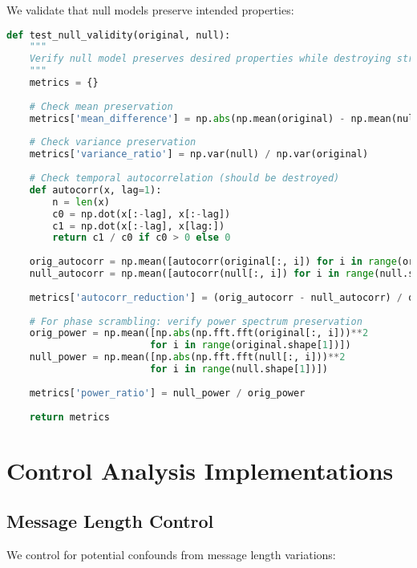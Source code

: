 \documentclass[11pt,letterpaper]{article}
\begin{document}
We validate that null models preserve intended properties:

\begin{lstlisting}[language=Python]
def test_null_validity(original, null):
    """
    Verify null model preserves desired properties while destroying structure.
    """
    metrics = {}
    
    # Check mean preservation
    metrics['mean_difference'] = np.abs(np.mean(original) - np.mean(null))
    
    # Check variance preservation
    metrics['variance_ratio'] = np.var(null) / np.var(original)
    
    # Check temporal autocorrelation (should be destroyed)
    def autocorr(x, lag=1):
        n = len(x)
        c0 = np.dot(x[:-lag], x[:-lag])
        c1 = np.dot(x[:-lag], x[lag:])
        return c1 / c0 if c0 > 0 else 0
    
    orig_autocorr = np.mean([autocorr(original[:, i]) for i in range(original.shape[1])])
    null_autocorr = np.mean([autocorr(null[:, i]) for i in range(null.shape[1])])
    
    metrics['autocorr_reduction'] = (orig_autocorr - null_autocorr) / orig_autocorr
    
    # For phase scrambling: verify power spectrum preservation
    orig_power = np.mean([np.abs(np.fft.fft(original[:, i]))**2 
                         for i in range(original.shape[1])])
    null_power = np.mean([np.abs(np.fft.fft(null[:, i]))**2 
                         for i in range(null.shape[1])])
    
    metrics['power_ratio'] = null_power / orig_power
    
    return metrics
\end{lstlisting}

\section{Control Analysis Implementations}
\label{app:control-analyses}

\subsection{Message Length Control}

We control for potential confounds from message length variations:
\end{document}
